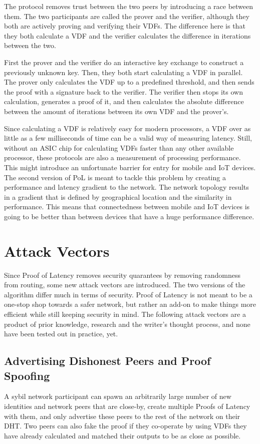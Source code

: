 The protocol removes trust between the two peers by introducing a race between them. The two participants are called the prover and the verifier, although they both are actively proving and verifying their VDFs. The difference here is that they both calculate a VDF and the verifier calculates the difference in iterations between the two.

First the prover and the verifier do an interactive key exchange to construct a previously unknown key. Then, they both start calculating a VDF in parallel. The prover only calculates the VDF up to a predefined threshold, and then sends the proof with a signature back to the verifier. The verifier then stops its own calculation, generates a proof of it, and then calculates the absolute difference between the amount of iterations between its own VDF and the prover's.

Since calculating a VDF is relatively easy for modern processors, a VDF over as little as a few milliseconds of time can be a valid way of measuring latency. Still, without an ASIC chip for calculating VDFs faster than any other available processor, these protocols are also a measurement of processing performance. This might introduce an unfortunate barrier for entry for mobile and IoT devices. The second version of PoL is meant to tackle this problem by creating a performance and latency gradient to the network. The network topology results in a gradient that is defined by geographical location and the similarity in performance. This means that connectedness between mobile and IoT devices is going to be better than between devices that have a huge performance difference.

\section{Attack Vectors}
Since Proof of Latency removes security quarantees by removing randomness from routing, some new attack vectors are introduced. The two versions of the algorithm differ much in terms of security. Proof of Latency is not meant to be a one-stop shop towards a safer network, but rather an add-on to make things more efficient while still keeping security in mind. The following attack vectors are a product of prior knowledge, research and the writer's thought process, and none have been tested out in practice, yet.

\subsection{Advertising Dishonest Peers and Proof Spoofing}
A sybil network participant can spawn an arbitrarily large number of new identities and network peers that are close-by, create multiple Proofs of Latency with them, and only advertise these peers to the rest of the network on their DHT. Two peers can also fake the proof if they co-operate by using VDFs they have already calculated and matched their outputs to be as close as possible.

